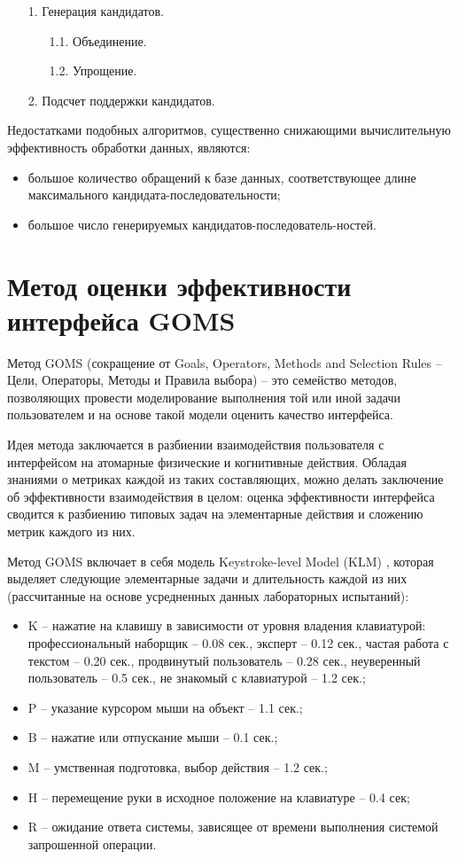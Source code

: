 \begin{enumerate}
	\item[1.] Генерация кандидатов.
	\begin{enumerate}
		\item[1.1.] Объединение.
		\item[1.2.] Упрощение.
	\end{enumerate}
	\item[2.] Подсчет поддержки кандидатов.
\end{enumerate}

Недостатками подобных алгоритмов, существенно снижающими вычислительную эффективность обработки данных, являются:
\begin{itemize}
	\item большое количество обращений к базе данных, соответствующее длине максимального кандидата-последовательности;
	\item большое число генерируемых кандидатов-последователь-ностей.
\end{itemize}

\section{Метод оценки эффективности интерфейса GOMS}
Метод GOMS (сокращение от Goals, Operators, Methods and Selection Rules -- Цели, Операторы, Методы и Правила выбора) -- это семейство методов, позволяющих провести моделирование выполнения той или иной задачи пользователем и на основе такой модели оценить качество интерфейса.

Идея метода заключается в разбиении взаимодействия пользователя с интерфейсом на атомарные физические и когнитивные действия. Обладая знаниями о метриках каждой из таких составляющих, можно делать заключение об эффективности взаимодействия в целом: оценка
эффективности интерфейса сводится к разбиению типовых задач на элементарные действия и сложению метрик каждого из них.

Метод GOMS включает в себя модель Keystroke-level Model (KLM) \cite{11}, которая выделяет следующие элементарные задачи и длительность каждой из них (рассчитанные на основе усредненных данных лабораторных испытаний):

\begin{itemize}
	\item K – нажатие на клавишу в зависимости от уровня владения клавиатурой: профессиональный	наборщик – 0.08 сек., эксперт – 0.12 сек., частая работа с текстом – 0.20 сек., продвинутый пользователь – 0.28 сек., неуверенный пользователь – 0.5 сек., не знакомый с клавиатурой – 1.2 сек.;
	\item P – указание курсором мыши на объект – 1.1 сек.;
	\item B – нажатие или отпускание мыши – 0.1 сек.;
	\item M – умственная подготовка, выбор действия – 1.2 сек.;
	\item H – перемещение руки в исходное положение на клавиатуре – 0.4 сек;
	\item R – ожидание ответа системы, зависящее от	времени выполнения системой запрошенной операции.
\end{itemize}

